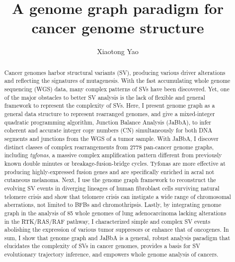 \documentclass[phd,tocprelim]{cornell}
\title{A genome graph paradigm for cancer genome structure}
\author {Xiaotong Yao}
\begin{document}
\maketitle
\makecopyright

\begin{abstract}
    Cancer genomes harbor structural variants (SV), producing various driver alterations and reflecting the signatures of mutagenesis. With the fast accumulating whole genome sequencing (WGS) data, many complex patterns of SVs have been discovered. Yet, one of the major obstacles to better SV analysis is the lack of flexible and general framework to represent the complexity of SVs. Here, I present genome graph as a general data structure to represent rearranged genomes, and give a mixed-integer quadratic programming algorithm, Junction Balance Analysis (JaBbA), to infer coherent and accurate integer copy numbers (CN) simultaneously for both DNA segments and junctions from the WGS of a tumor sample. With JaBbA, I discover distinct classes of complex rearrangements from 2778 pan-cancer genome graphs, including \textit{tyfonas}, a massive complex amplification pattern different from previously known double minutes or breakage-fusion-bridge cycles. Tyfonas are more effective at producing highly-expressed fusion genes and are specifically enriched in acral not cutaneous melanoma. Next, I use the genome graph framework to reconstruct the evolving SV events in diverging lineages of human fibroblast cells surviving natural telomere crisis and show that telomere crisis can instigate a wide range of chromosomal aberrations, not limited to BFBs and chromothripsis. Lastly, by integrating genome graph in the analysis of 85 whole genomes of lung adenocarcinoma lacking alterations in the RTK/RAS/RAF pathway, I characterized simple and complex SV events abolishing the expression of various tumor suppresors or enhance that of oncogenes. In sum, I show that genome graph and JaBbA is a general, robust analysis paradigm that elucidates the complexity of SVs in cancer genomes, provides a basis for SV evolutionary trajectory inference, and empowers whole genome analysis of cancers.

\end{abstract}
\end{document}
